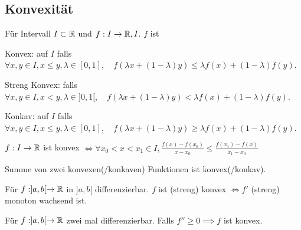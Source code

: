 \subsection{Konvexität}
Für Intervall $I \subset \mathbb{R}$ und $f:I \to \mathbb{R}, I$. $f$ ist
\begin{compactdesc}
    \item[Konvex:] auf $I$ falls $\forall x, y \in I, x \le y, \lambda \in [0, 1], \quad f(\lambda x + (1- \lambda)y) \le \lambda f(x) + (1 - \lambda) f(y)$.
    \item[Streng Konvex:] falls $\forall x, y \in I, x < y, \lambda \in ]0, 1[, \quad f(\lambda x + (1 - \lambda)y) < \lambda f(x) + (1 - \lambda)f(y)$.
    \item[Konkav:] auf $I$ falls $\forall x, y \in I, x \le y, \lambda \in [0, 1], \quad f(\lambda x + (1- \lambda)y) \ge \lambda f(x) + (1 - \lambda) f(y)$.
\end{compactdesc}
\begin{compactitem}
\item $f:I \to \mathbb{R}$ ist konvex $\iff \forall x_0 < x < x_1 \in I, \frac{f(x) - f(x_0)}{x-x_0} \le \frac{f(x_1) - f(x)}{x_1 - x_0}$
    \item Summe von zwei konvexen(/konkaven) Funktionen ist konvex(/konkav).
    \item Für $f:]a,b[ \to \mathbb{R}$ in $]a,b[$ differenzierbar. $f$ ist (streng) konvex $\iff f'$ (streng) monoton wachsend ist.
    \item Für $f:]a,b[ \to \mathbb{R}$ zwei mal differenzierbar. Falls $f'' \ge 0 \implies f$ ist konvex.
\end{compactitem}

